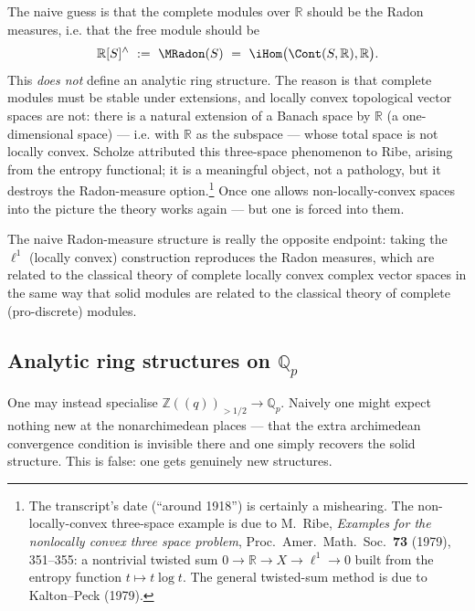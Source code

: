 \begin{remark}
\label{rmk:12:radon-warning}
The naive guess is that the complete modules over $\mathbb{R}$ should be the
Radon measures, i.e. that the free module should be
\begin{equation*}
\mathbb{R}[S]^{\wedge}\ :=\ \MRadon(S)\ =\ \iHom\bigl(\Cont(S,\mathbb{R}),\mathbb{R}\bigr).
\end{equation*}
This \emph{does not} define an analytic ring structure. The reason is that
complete modules must be stable under extensions, and locally convex
topological vector spaces are not: there is a natural extension of a Banach space
by $\mathbb{R}$ (a one-dimensional space) --- i.e. with $\mathbb{R}$ as the
subspace --- whose total space is not locally convex. Scholze attributed this
three-space phenomenon to Ribe, arising from the entropy functional; it is a
meaningful object, not a pathology, but it destroys the Radon-measure
option.\footnote{The transcript's date (``around 1918'') is certainly a
mishearing. The non-locally-convex three-space example is due to M.~Ribe,
\emph{Examples for the nonlocally convex three space problem}, Proc.\ Amer.\
Math.\ Soc.\ \textbf{73} (1979), 351--355: a nontrivial twisted sum
$0\to\mathbb{R}\to X\to\ell^1\to 0$ built from the entropy function
$t\mapsto t\log t$. The general twisted-sum method is due to Kalton--Peck (1979).}
Once one
allows non-locally-convex spaces into the picture the theory works again --- but
one is forced into them.
\end{remark}

The naive Radon-measure structure is really the opposite endpoint: taking the
$\ell^{1}$ (locally convex) construction reproduces the Radon measures, which are
related to the classical theory of complete locally convex complex vector spaces
in the same way that solid modules are related to the classical theory of
complete (pro-discrete) modules.

\subsection{Analytic ring structures on \texorpdfstring{$\mathbb{Q}_p$}{Qp}}

One may instead specialise $\mathbb{Z}(\!(q)\!)_{>1/2}\to\mathbb{Q}_p$. Naively
one might expect nothing new at the nonarchimedean places --- that the extra
archimedean convergence condition is invisible there and one simply recovers the
solid structure. This is false: one gets genuinely new structures.

